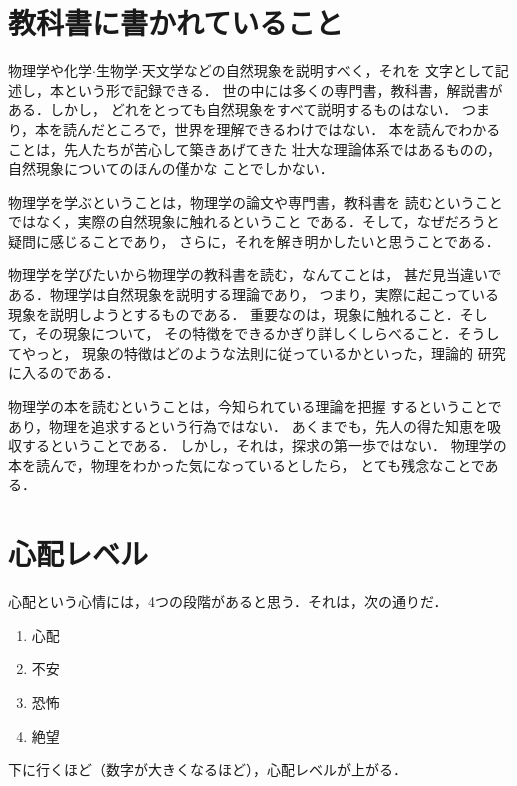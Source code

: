         \section{教科書に書かれていること}
            物理学や化学$\cdot$生物学$\cdot$天文学などの自然現象を説明すべく，それを
            文字として記述し，本という形で記録できる．
            世の中には多くの専門書，教科書，解説書がある．しかし，
            どれをとっても自然現象をすべて説明するものはない．
            つまり，本を読んだところで，世界を理解できるわけではない．
            本を読んでわかることは，先人たちが苦心して築きあげてきた
            壮大な理論体系ではあるものの，自然現象についてのほんの僅かな
            ことでしかない．

            物理学を学ぶということは，物理学の論文や専門書，教科書を
            読むということではなく，実際の自然現象に触れるということ
            である．そして，なぜだろうと疑問に感じることであり，
            さらに，それを解き明かしたいと思うことである．

            物理学を学びたいから物理学の教科書を読む，なんてことは，
            甚だ見当違いである．物理学は自然現象を説明する理論であり，
            つまり，実際に起こっている現象を説明しようとするものである．
            重要なのは，現象に触れること．そして，その現象について，
            その特徴をできるかぎり詳しくしらべること．そうしてやっと，
            現象の特徴はどのような法則に従っているかといった，理論的
            研究に入るのである．

            物理学の本を読むということは，今知られている理論を把握
            するということであり，物理を追求するという行為ではない．
            あくまでも，先人の得た知恵を吸収するということである．
            しかし，それは，探求の第一歩ではない．
            物理学の本を読んで，物理をわかった気になっているとしたら，
            とても残念なことである．


        \section{心配レベル}
            心配という心情には，4つの段階があると思う．それは，次の通りだ．
                \begin{enumerate}
                    \item 心配
                    \item 不安
                    \item 恐怖
                    \item 絶望
                \end{enumerate}
            下に行くほど（数字が大きくなるほど），心配レベルが上がる．
            

